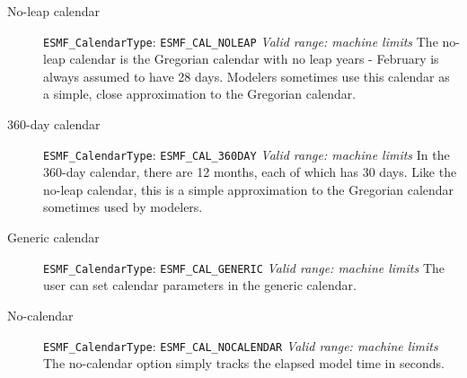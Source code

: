 \begin{description}
\item[No-leap calendar]
{\tt ESMF\_CalendarType}:  {\tt ESMF\_CAL\_NOLEAP} \newline
{\it Valid range: machine limits} \newline
The no-leap calendar is the Gregorian calendar with no leap years - 
February is always assumed to have 28 days.  Modelers sometimes use this 
calendar as a simple, close approximation to the Gregorian calendar.

\item[360-day calendar]
{\tt ESMF\_CalendarType}:  {\tt ESMF\_CAL\_360DAY} \newline
{\it Valid range: machine limits} \newline
In the 360-day calendar, there are 12 months, each of which has 30 days.  
Like the no-leap calendar, this is a simple approximation to the Gregorian
calendar sometimes used by modelers.

\item[Generic calendar] 
{\tt ESMF\_CalendarType}:  {\tt ESMF\_CAL\_GENERIC} \newline
{\it Valid range: machine limits} \newline 
The user can set calendar parameters in the generic calendar.

\item[No-calendar]
{\tt ESMF\_CalendarType}:  {\tt ESMF\_CAL\_NOCALENDAR} \newline
{\it Valid range: machine limits} \newline 
The no-calendar option simply tracks the elapsed model time in seconds.

\end{description}




